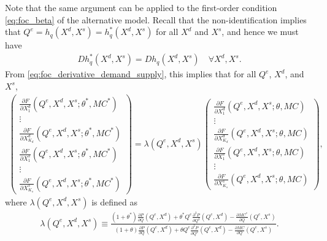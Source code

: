 \documentclass[11pt, a4paper]{article}
\theoremstyle{remark}
\begin{document}
Note that the same argument can be applied to the first-order condition \eqref{eq:foc_beta} of the alternative model.
Recall that the non-identification implies that $Q^e = h_q(X^{d}, X^{s}) = h_q^{*}(X^{d}, X^{s})$ for all $X^{d}$ and $X^{s}$, and hence we must have
\begin{align}
    Dh_q^{*}(X^{d}, X^{s}) = Dh_q(X^{d}, X^{s}) \quad \forall X^{d}, X^{s}. \label{eq:observale_equivalence_derivative}
\end{align}
From \eqref{eq:foc_derivative_demand_supply}, this implies that for all $Q^e$, $X^{d}$, and $X^{s}$,
\begin{align}
    \begin{pmatrix}
        \frac{\partial F}{\partial X^{d}_{1}}(Q^e, X^{d}, X^{s}; \theta^{*}, MC^{*})\\
        \vdots \\
        \frac{\partial F}{\partial X^{d}_{K_d}}(Q^e, X^{d}, X^{s}; \theta^{*}, MC^{*})\\
        \frac{\partial F}{\partial X^{s}_{1}}(Q^e, X^{d}, X^{s}; \theta^{*}, MC^{*})\\
        \vdots \\
        \frac{\partial F}{\partial X^{s}_{K_s}}(Q^e, X^{d}, X^{s}; \theta^{*}, MC^{*})
    \end{pmatrix}
    = \lambda(Q^e, X^{d}, X^{s})
    \begin{pmatrix}
        \frac{\partial F}{\partial X^{d}_{1}}(Q^e, X^{d}, X^{s}; \theta, MC)\\
        \vdots \\
        \frac{\partial F}{\partial X^{d}_{K_d}}(Q^e, X^{d}, X^{s}; \theta, MC)\\
        \frac{\partial F}{\partial X^{s}_{1}}(Q^e, X^{d}, X^{s}; \theta, MC)\\
        \vdots \\
        \frac{\partial F}{\partial X^{s}_{K_s}}(Q^e, X^{d}, X^{s}; \theta, MC)
    \end{pmatrix},\label{eq:foc_derivative_demand_supply_lambda}
\end{align}
where $\lambda(Q^e, X^{d}, X^{s})$ is defined as
\begin{align}
    \lambda(Q^e, X^{d}, X^{s}) \equiv \frac{(1+\theta^{*})\frac{\partial P}{\partial Q}(Q^e, X^{d}) + \theta^{*} Q^e\frac{\partial^2 P}{\partial Q^2}(Q^e, X^{d}) - \frac{\partial MC^{*}}{\partial Q}(Q^e, X^{s})}{(1+\theta)\frac{\partial P}{\partial Q}(Q^e, X^{d}) + \theta Q^e\frac{\partial^2 P}{\partial Q^2}(Q^e, X^{d}) - \frac{\partial MC}{\partial Q}(Q^e, X^{s})}. \label{eq:lambda_foc}
\end{align}
\end{document}
